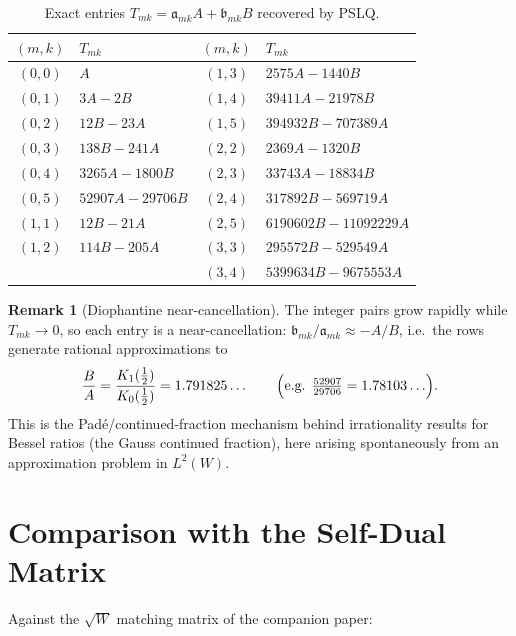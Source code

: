 \documentclass[11pt,a4paper]{article}
\theoremstyle{definition}
\newtheorem{remark}[definition]{Remark}
\theoremstyle{plain}
\begin{document}
\begin{table}[ht]
\centering
\caption{Exact entries $T_{mk} = \mathfrak{a}_{mk} A +
\mathfrak{b}_{mk} B$ recovered by PSLQ.}
\label{tab:exact}
\small
\begin{tabular}{cl@{\qquad}cl}
\toprule
$(m,k)$ & $T_{mk}$ & $(m,k)$ & $T_{mk}$ \\
\midrule
$(0,0)$ & $A$                   & $(1,3)$ & $2575A - 1440B$ \\
$(0,1)$ & $3A - 2B$             & $(1,4)$ & $39411A - 21978B$ \\
$(0,2)$ & $12B - 23A$           & $(1,5)$ & $394932B - 707389A$ \\
$(0,3)$ & $138B - 241A$         & $(2,2)$ & $2369A - 1320B$ \\
$(0,4)$ & $3265A - 1800B$       & $(2,3)$ & $33743A - 18834B$ \\
$(0,5)$ & $52907A - 29706B$     & $(2,4)$ & $317892B - 569719A$ \\
$(1,1)$ & $12B - 21A$           & $(2,5)$ & $6190602B - 11092229A$ \\
$(1,2)$ & $114B - 205A$         & $(3,3)$ & $295572B - 529549A$ \\
        &                       & $(3,4)$ & $5399634B - 9675553A$ \\
\bottomrule
\end{tabular}
\end{table}

\begin{remark}[Diophantine near-cancellation]
The integer pairs grow rapidly while $T_{mk} \to 0$, so each entry is a
near-cancellation: $\mathfrak{b}_{mk}/\mathfrak{a}_{mk} \approx -A/B$,
i.e.\ the rows generate rational approximations to
\[
  \frac{B}{A} = \frac{K_1(\tfrac12)}{K_0(\tfrac12)} = 1.791825\ldots
  \qquad \Bigl(\text{e.g. } \tfrac{52907}{29706} = 1.78103\ldots\Bigr).
\]
This is the Pad\'e/continued-fraction mechanism behind irrationality
results for Bessel ratios (the Gauss continued fraction), here arising
spontaneously from an approximation problem in $L^2(W)$.
\end{remark}

\section{Comparison with the Self-Dual Matrix}

Against the $\sqrt{W}$ matching matrix of the companion paper:
\end{document}
